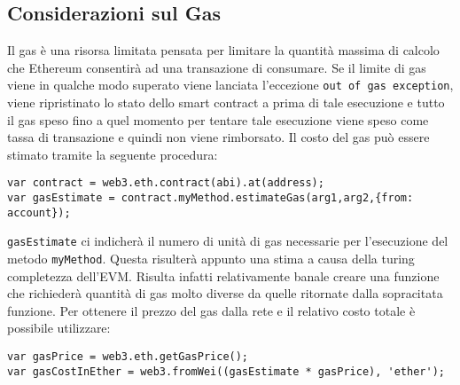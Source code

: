 \subsection*{Considerazioni sul Gas}
Il gas è una risorsa limitata pensata per limitare la quantità massima di calcolo che Ethereum consentirà ad una transazione di consumare. Se il limite di gas viene in qualche modo superato viene lanciata l'eccezione \lstinline|out of gas exception|, viene ripristinato lo stato dello smart contract a prima di tale esecuzione e tutto il gas speso fino a quel momento per tentare tale esecuzione viene speso come tassa di transazione e quindi non viene rimborsato. Il costo del gas può essere stimato tramite la seguente procedura:
\begin{lstlisting}[numbers=none,frame=none]
var contract = web3.eth.contract(abi).at(address);
var gasEstimate = contract.myMethod.estimateGas(arg1,arg2,{from: account});
\end{lstlisting}
\lstinline|gasEstimate| ci indicherà il numero di unità di gas necessarie per l'esecuzione del metodo \lstinline|myMethod|. Questa risulterà appunto una stima a causa della turing completezza dell'EVM. Risulta infatti relativamente banale creare una funzione che richiederà quantità di gas molto diverse da quelle ritornate dalla sopracitata funzione. Per ottenere il prezzo del gas dalla rete e il relativo costo totale è possibile utilizzare:
\begin{lstlisting}[numbers=none,frame=none]
var gasPrice = web3.eth.getGasPrice();
var gasCostInEther = web3.fromWei((gasEstimate * gasPrice), 'ether');
\end{lstlisting}

